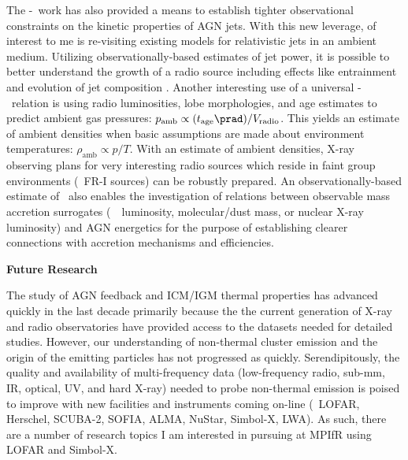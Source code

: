 \documentclass[11pt]{article}
\begin{document}
The \pjet-\prad\ work has also provided a means to establish tighter
observational constraints on the kinetic properties of AGN jets. With
this new leverage, of interest to me is re-visiting existing models
for relativistic jets in an ambient medium. Utilizing
observationally-based estimates of jet power, it is possible to better
understand the growth of a radio source including effects like
entrainment and evolution of jet composition \cite[\'a
  la][]{1999MNRAS.309.1017W}. Another interesting use of a universal
\pjet-\prad\ relation is using radio luminosities, lobe morphologies,
and age estimates to predict ambient gas pressures: $p_{\mathrm{amb}}
\propto (t_{\mathrm{age}}\prad) / V_{\mathrm{radio}}$. This yields an
estimate of ambient densities when basic assumptions are made about
environment temperatures: $\rho_{\mathrm{amb}} \propto p/T$. With an
estimate of ambient densities, X-ray observing plans for very
interesting radio sources which reside in faint group environments
(\ie\ FR-I sources) can be robustly prepared. An observationally-based
estimate of \pjet\ also enables the investigation of relations between
observable mass accretion surrogates (\ie\ \halpha\ luminosity,
molecular/dust mass, or nuclear X-ray luminosity) and AGN energetics
for the purpose of establishing clearer connections with accretion
mechanisms and efficiencies.

{\bf{Future Research}}


The study of AGN feedback and ICM/IGM thermal properties has advanced
quickly in the last decade primarily because the the current
generation of X-ray and radio observatories have provided access to
the datasets needed for detailed studies. However, our understanding
of non-thermal cluster emission and the origin of the emitting
particles has not progressed as quickly. Serendipitously, the quality
and availability of multi-frequency data (low-frequency radio, sub-mm,
IR, optical, UV, and hard X-ray) needed to probe non-thermal emission
is poised to improve with new facilities and instruments coming
on-line (\ie\ LOFAR, Herschel, SCUBA-2, SOFIA, ALMA, NuStar, Simbol-X,
LWA). As such, there are a number of research topics I am interested
in pursuing at MPIfR using LOFAR and Simbol-X.
\end{document}
